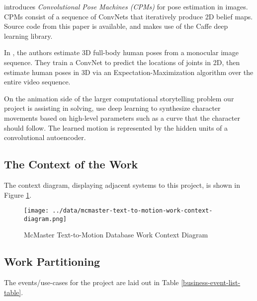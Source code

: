 \documentclass{scrreprt}
\begin{document}
\cite{DBLP:journals/corr/WeiRKS16} introduces \textit{Convolutional Pose
Machines (CPMs)} for pose estimation in images. CPMs consist of a sequence of
ConvNets that iteratively produce 2D belief maps. Source code from this paper
is available, and makes use of the Caffe deep learning library.

In \cite{zhou2016sparseness}, the authors estimate 3D full-body human poses
from a monocular image sequence. They train a ConvNet to predict the locations
of joints in 2D, then estimate human poses in 3D via an
Expectation-Maximization algorithm over the entire video sequence.

On the animation side of the larger computational storytelling problem our
project is assisting in solving, \cite{Holden2016} use
deep learning to synthesize character movements based on high-level parameters
such as a curve that the character should follow. The learned motion is
represented by the hidden units of a convolutional autoencoder.

\subsection{The Context of the Work}

The context diagram, displaying adjacent systems to this project, is shown in
Figure \ref{work-context-diagram}.

\begin{figure}[!ht]
        \caption{McMaster Text-to-Motion Database Work Context Diagram}
        \label{work-context-diagram}
        \centering
        \texttt{[image: ../data/mcmaster-text-to-motion-work-context-diagram.png]}
\end{figure}

\subsection{Work Partitioning}
\label{work-partitioning}

The events/use-cases for the project are laid out in Table \ref{business-event-list-table}.
\end{document}
